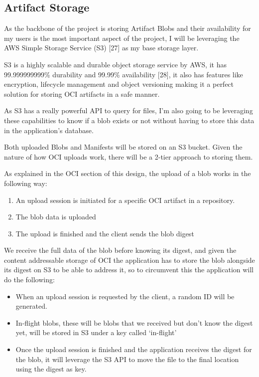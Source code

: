 \documentclass{article}
\begin{document}
  \subsection{Artifact Storage}

  As the backbone of the project is storing Artifact Blobs and their availability for my users is the most important aspect of the project, I will be leveraging the AWS Simple Storage Service (S3) [27] as my base storage layer.

  S3 is a highly scalable and durable object storage service by AWS, it has 99.999999999\% durability and 99.99\% availability [28], it also has features like encryption, lifecycle management and object versioning making it a perfect solution for storing OCI artifacts in a safe manner.

  As S3 has a really powerful API to query for files, I'm also going to be leveraging these capabilities to know if a blob exists or not without having to store this data in the application's database.

  Both uploaded Blobs and Manifests will be stored on an S3 bucket. Given the nature of how OCI uploads work, there will be a 2-tier approach to storing them.

  As explained in the OCI section of this design, the upload of a blob works in the following way:

  \begin{enumerate}
    \item An upload session is initiated for a specific OCI artifact in a repository.
    \item The blob data is uploaded
    \item The upload is finished and the client sends the blob digest
  \end{enumerate}

  We receive the full data of the blob before knowing its digest, and given the content addressable storage of OCI the application has to store the blob alongside its digest on S3 to be able to address it, so to circumvent this the application will do the following:

  \begin{itemize}
    \item When an upload session is requested by the client, a random ID will be generated.
    \item In-flight blobs, these will be blobs that we received but don't know the digest yet, will be stored in S3 under a key called `in-flight'
    \item Once the upload session is finished and the application receives the digest for the blob, it will leverage the S3 API to move the file to the final location using the digest as key.
  \end{itemize}
\end{document}
